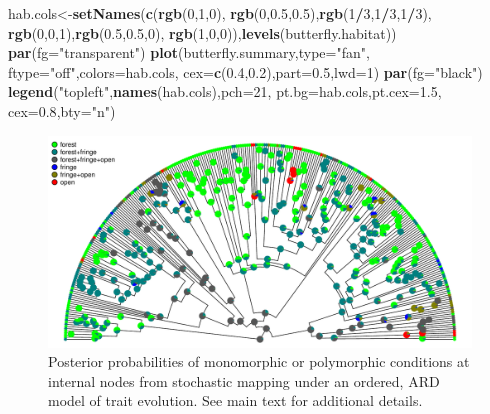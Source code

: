 \documentclass[fleqn,10pt,lineno]{wlpeerj} %
\newenvironment{Shaded}{\begin{snugshade}}{\end{snugshade}}
\newcommand{\AttributeTok}[1]{\textcolor[rgb]{0.13,0.29,0.53}{#1}}
\newcommand{\DecValTok}[1]{\textcolor[rgb]{0.00,0.00,0.81}{#1}}
\newcommand{\FloatTok}[1]{\textcolor[rgb]{0.00,0.00,0.81}{#1}}
\newcommand{\FunctionTok}[1]{\textcolor[rgb]{0.13,0.29,0.53}{\textbf{#1}}}
\newcommand{\NormalTok}[1]{#1}
\newcommand{\OtherTok}[1]{\textcolor[rgb]{0.56,0.35,0.01}{#1}}
\newcommand{\SpecialCharTok}[1]{\textcolor[rgb]{0.81,0.36,0.00}{\textbf{#1}}}
\newcommand{\StringTok}[1]{\textcolor[rgb]{0.31,0.60,0.02}{#1}}
\begin{document}
\begin{Shaded}
\begin{Highlighting}[]
\NormalTok{hab.cols}\OtherTok{\textless{}{-}}\FunctionTok{setNames}\NormalTok{(}\FunctionTok{c}\NormalTok{(}\FunctionTok{rgb}\NormalTok{(}\DecValTok{0}\NormalTok{,}\DecValTok{1}\NormalTok{,}\DecValTok{0}\NormalTok{),}
  \FunctionTok{rgb}\NormalTok{(}\DecValTok{0}\NormalTok{,}\FloatTok{0.5}\NormalTok{,}\FloatTok{0.5}\NormalTok{),}\FunctionTok{rgb}\NormalTok{(}\DecValTok{1}\SpecialCharTok{/}\DecValTok{3}\NormalTok{,}\DecValTok{1}\SpecialCharTok{/}\DecValTok{3}\NormalTok{,}\DecValTok{1}\SpecialCharTok{/}\DecValTok{3}\NormalTok{),}
  \FunctionTok{rgb}\NormalTok{(}\DecValTok{0}\NormalTok{,}\DecValTok{0}\NormalTok{,}\DecValTok{1}\NormalTok{),}\FunctionTok{rgb}\NormalTok{(}\FloatTok{0.5}\NormalTok{,}\FloatTok{0.5}\NormalTok{,}\DecValTok{0}\NormalTok{),}
  \FunctionTok{rgb}\NormalTok{(}\DecValTok{1}\NormalTok{,}\DecValTok{0}\NormalTok{,}\DecValTok{0}\NormalTok{)),}\FunctionTok{levels}\NormalTok{(butterfly.habitat))}
\FunctionTok{par}\NormalTok{(}\AttributeTok{fg=}\StringTok{"transparent"}\NormalTok{)}
\FunctionTok{plot}\NormalTok{(butterfly.summary,}\AttributeTok{type=}\StringTok{"fan"}\NormalTok{,}
  \AttributeTok{ftype=}\StringTok{"off"}\NormalTok{,}\AttributeTok{colors=}\NormalTok{hab.cols,}
  \AttributeTok{cex=}\FunctionTok{c}\NormalTok{(}\FloatTok{0.4}\NormalTok{,}\FloatTok{0.2}\NormalTok{),}\AttributeTok{part=}\FloatTok{0.5}\NormalTok{,}\AttributeTok{lwd=}\DecValTok{1}\NormalTok{)}
\FunctionTok{par}\NormalTok{(}\AttributeTok{fg=}\StringTok{"black"}\NormalTok{)}
\FunctionTok{legend}\NormalTok{(}\StringTok{"topleft"}\NormalTok{,}\FunctionTok{names}\NormalTok{(hab.cols),}\AttributeTok{pch=}\DecValTok{21}\NormalTok{,}
  \AttributeTok{pt.bg=}\NormalTok{hab.cols,}\AttributeTok{pt.cex=}\FloatTok{1.5}\NormalTok{,}
  \AttributeTok{cex=}\FloatTok{0.8}\NormalTok{,}\AttributeTok{bty=}\StringTok{"n"}\NormalTok{)}
\end{Highlighting}
\end{Shaded}

\begin{figure}
\includegraphics[width=1\linewidth]{Revell.phytools-v2_peerj_files/figure-latex/anc-fitpolyMk-1} \caption{Posterior probabilities of monomorphic or polymorphic conditions at internal nodes from stochastic mapping under an ordered, ARD model of trait evolution. See main text for additional details.}\label{fig:anc-fitpolyMk}
\end{figure}
\end{document}
